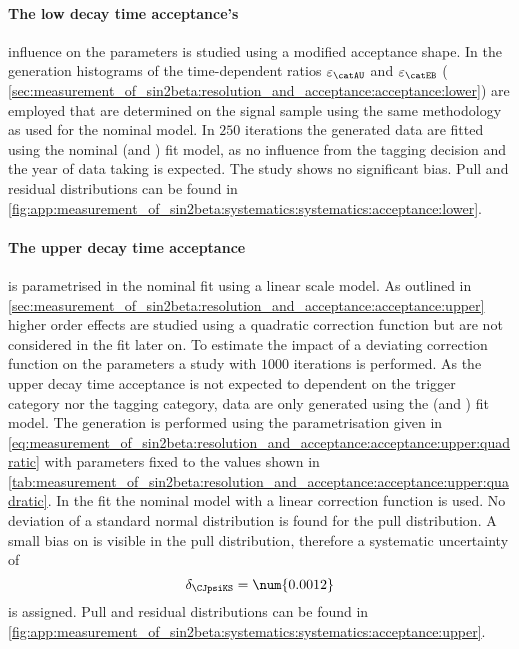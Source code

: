\paragraph{The low decay time acceptance's} influence on the \CP parameters is
studied using a modified acceptance shape. In the generation histograms of the
time-dependent ratios $\varepsilon_{\catAU}$ and $\varepsilon_{\catEB}$ (\cf
\cref{sec:measurement_of_sin2beta:resolution_and_acceptance:acceptance:lower})
are employed that are determined on the signal \MC sample using the same
methodology as used for the nominal model. In $\num{250}$ iterations the
generated data are fitted using the nominal (\catOT and \catOS) fit model, as no
influence from the tagging decision and the year of data taking is expected. The
\ToyMC study shows no significant bias. Pull and residual distributions can be
found in
\cref{fig:app:measurement_of_sin2beta:systematics:systematics:acceptance:lower}.

\paragraph{The upper decay time acceptance} is parametrised in the nominal fit
using a linear scale model. As outlined in
\cref{sec:measurement_of_sin2beta:resolution_and_acceptance:acceptance:upper}
higher order effects are studied using a quadratic correction function but are
not considered in the fit later on. To estimate the impact of a deviating
correction function on the \CP parameters a \ToyMC study with $\num{1000}$
iterations is performed. As the upper decay time acceptance is not expected to
dependent on the trigger category nor the tagging category, data are only
generated using the (\catAU and \catOS) fit model. The generation is performed
using the parametrisation given in \cref{eq:measurement_of_sin2beta:resolution_and_acceptance:acceptance:upper:quadratic} 
with parameters fixed to the values shown in
\cref{tab:measurement_of_sin2beta:resolution_and_acceptance:acceptance:upper:quadratic}. 
In the fit the nominal model with a linear correction function is used. No
deviation of a standard normal distribution is found for the \SJpsiKS pull
distribution. A small bias on \CJpsiKS is visible in the pull distribution,
therefore a systematic uncertainty of
%
\begin{equation}
  \delta_{\CJpsiKS} = \num{0.0012}
\end{equation}
%
is assigned. Pull and residual distributions can be found in
\cref{fig:app:measurement_of_sin2beta:systematics:systematics:acceptance:upper}.

